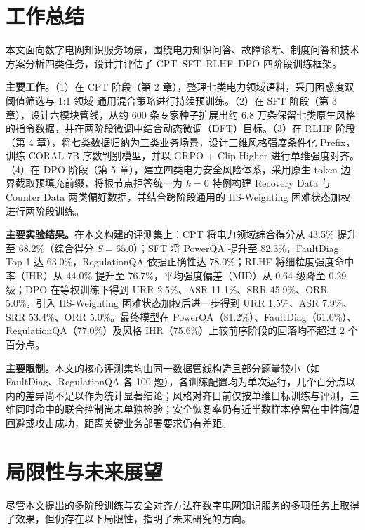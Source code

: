 \documentclass[fontset=fandol,type=master,campus=shenzhen,etitleauto=true]{hithesisbook}
\begin{document}
\backmatter
\begin{conclusions}
\label{ux603bux7ed3ux4e0eux5c55ux671b}

\section*{工作总结}\label{ux5de5ux4f5cux603bux7ed3}

本文面向数字电网知识服务场景，围绕电力知识问答、故障诊断、制度问答和技术方案分析四类任务，设计并评估了 CPT--SFT--RLHF--DPO 四阶段训练框架。

\textbf{主要工作。}（1）在 CPT 阶段（第 2 章），整理七类电力领域语料，采用困惑度双阈值筛选与 1:1 领域-通用混合策略进行持续预训练。（2）在 SFT 阶段（第 3 章），设计六模块管线，从约 600 条专家种子扩展出约 6.8 万条保留七类原生风格的指令数据，并在两阶段微调中结合动态微调（DFT）目标。（3）在 RLHF 阶段（第 4 章），将七类数据归纳为三类业务场景，设计三维风格强度条件化 Prefix，训练 CORAL-7B 序数判别模型，并以 GRPO + Clip-Higher 进行单维强度对齐。（4）在 DPO 阶段（第 5 章），建立四类电力安全风险体系，采用原生 token 边界截取预填充前缀，将根节点拒答统一为 $k=0$ 特例构建 Recovery Data 与 Counter Data 两类偏好数据，并结合跨阶段通用的 HS-Weighting 困难状态加权进行两阶段训练。

\textbf{主要实验结果。}在本文构建的评测集上：CPT 将电力领域综合得分从 43.5\% 提升至 68.2\%（综合得分 $S=65.0$）；SFT 将 PowerQA 提升至 82.3\%，FaultDiag Top-1 达 63.0\%，RegulationQA 依据正确性达 78.0\%；RLHF 将细粒度强度命中率（IHR）从 44.0\% 提升至 76.7\%，平均强度偏差（MID）从 0.64 级降至 0.29 级；DPO 在等权训练下得到 URR 2.5\%、ASR 11.1\%、SRR 45.9\%、ORR 5.0\%，引入 HS-Weighting 困难状态加权后进一步得到 URR 1.5\%、ASR 7.9\%、SRR 53.4\%、ORR 5.0\%。最终模型在 PowerQA（81.2\%）、FaultDiag（61.0\%）、RegulationQA（77.0\%）及风格 IHR（75.6\%）上较前序阶段的回落均不超过 2 个百分点。

\textbf{主要限制。}本文的核心评测集均由同一数据管线构造且部分题量较小（如 FaultDiag、RegulationQA 各 100 题），各训练配置均为单次运行，几个百分点以内的差异尚不足以作为统计显著结论；风格对齐目前仅按单维目标训练与评测，三维同时命中的联合控制尚未单独检验；安全恢复率仍有近半数样本停留在中性简短回避或攻击成功，距离关键业务部署要求仍有差距。

\section*{局限性与未来展望}\label{ux5c40ux9650ux6027ux4e0eux672aux6765ux5c55ux671b}

尽管本文提出的多阶段训练与安全对齐方法在数字电网知识服务的多项任务上取得了效果，但仍存在以下局限性，指明了未来研究的方向。


\end{conclusions}
\end{document}
